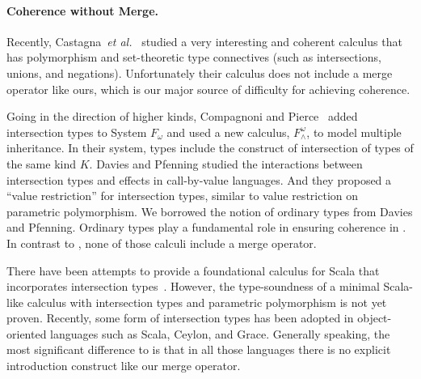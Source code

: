 \begin{comment}
 the way coherence is ensured is not general
enough. He has four different typing rules for the merge operator, each
accounting for various possibilities of what the types of the first and second
components are. In some cases the meaning of the second component takes
precedence (that is, is biased) over the first component. The set of rules is
restrictive and it forbids, for instance, the merge of two functions (even when
they a provably disjoint). Therefore, Forsythe treatment of coherence
is rather ad-hoc. In contrast, disjointness in \name has a simple, well-defined
specification and it is quite flexible.
\end{comment}

\paragraph{Coherence without Merge.}
Recently, Castagna~\textit{et al.}~\cite{Castagna:2014} studied a very interesting
and coherent calculus that has polymorphism and set-theoretic type connectives (such as
intersections, unions, and negations). Unfortunately their calculus
does not include a merge operator like ours, which is our major source
of difficulty for achieving coherence.

Going in the direction of higher
kinds, Compagnoni and Pierce~\cite{compagnoni1996higher} added
intersection types to System $ F_{\omega} $ and used a new calculus,
$ F^{\omega}_{\wedge} $, to model multiple inheritance. In their
system, types include the construct of intersection of types of the
same kind $ K $. Davies and Pfenning
\cite{davies2000intersection} studied the interactions between
intersection types and effects in call-by-value languages. And they
proposed a ``value restriction'' for intersection types, similar to
value restriction on parametric polymorphism.
We borrowed the notion of ordinary types from Davies and Pfenning.
Ordinary types play a fundamental role in ensuring coherence in \name.
In contrast to \name, none of those calculi include a merge operator.

There have been attempts to provide a foundational calculus
for Scala that incorporates intersection
types~\cite{amin2014foundations,amin2012dependent}.
However, the type-soundness of a minimal Scala-like
calculus with intersection types and parametric polymorphism is not
yet proven. Recently, some form of intersection
types has been adopted in object-oriented languages such as Scala,
Ceylon, and Grace. Generally speaking,
the most significant difference to \name is that in all those languages
there is no explicit introduction construct like our merge operator.

